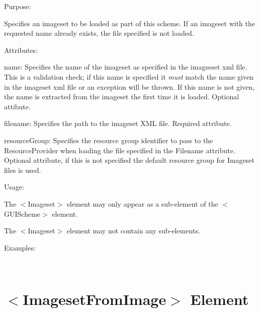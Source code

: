 \begin{DoxyItemize}
\item Purpose\+:
\begin{DoxyItemize}
\item Specifies an imageset to be loaded as part of this scheme. If an imageset with the requested name already exists, the file specified is not loaded.
\end{DoxyItemize}
\item Attributes\+:
\begin{DoxyItemize}
\item {\ttfamily name\+:} Specifies the name of the imageset as specified in the imagseset xml file. This is a validation check; if this name is specified it {\itshape must} match the name given in the imageset xml file or an exception will be thrown. If this name is not given, the name is extracted from the imageset the first time it is loaded. Optional attibute.
\item {\ttfamily filename\+:} Specifies the path to the imageset X\+ML file. Required attribute.
\item {\ttfamily resource\+Group\+:} Specifies the resource group identifier to pass to the Resource\+Provider when loading the file specified in the {\ttfamily Filename} attribute. Optional attribute, if this is not specified the default resource group for Imageset files is used.
\end{DoxyItemize}
\item Usage\+:
\begin{DoxyItemize}
\item The $<$Imageset$>$ element may only appear as a sub-\/element of the $<$G\+U\+I\+Scheme$>$ element.
\item The $<$Imageset$>$ element may not contain any sub-\/elements.
\end{DoxyItemize}
\item Examples\+:
\end{DoxyItemize}

~\newline
 \hypertarget{xml_scheme_xml_scheme_imagesetfromimage}{}\section{$<$\+Imageset\+From\+Image$>$ Element}\label{xml_scheme_xml_scheme_imagesetfromimage}

